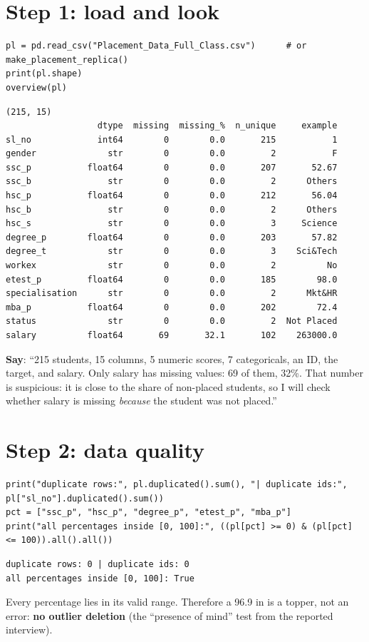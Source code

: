 \section{Step 1: load and look}
\begin{lstlisting}
pl = pd.read_csv("Placement_Data_Full_Class.csv")      # or make_placement_replica()
print(pl.shape)
overview(pl)
\end{lstlisting}
\outlabel
\begin{lstlisting}[style=out]
(215, 15)
                  dtype  missing  missing_%  n_unique     example
sl_no             int64        0        0.0       215           1
gender              str        0        0.0         2           F
ssc_p           float64        0        0.0       207       52.67
ssc_b               str        0        0.0         2      Others
hsc_p           float64        0        0.0       212       56.04
hsc_b               str        0        0.0         2      Others
hsc_s               str        0        0.0         3     Science
degree_p        float64        0        0.0       203       57.82
degree_t            str        0        0.0         3    Sci&Tech
workex              str        0        0.0         2          No
etest_p         float64        0        0.0       185        98.0
specialisation      str        0        0.0         2      Mkt&HR
mba_p           float64        0        0.0       202        72.4
status              str        0        0.0         2  Not Placed
salary          float64       69       32.1       102    263000.0
\end{lstlisting}
\textbf{Say}: ``215 students, 15 columns, 5 numeric scores, 7 categoricals, an ID, the target, and salary. Only salary has missing values: 69 of them, 32\%. That
number is suspicious: it is close to the share of non-placed students, so I will check whether salary is missing \emph{because} the student was not placed.''

\section{Step 2: data quality}
\begin{lstlisting}
print("duplicate rows:", pl.duplicated().sum(), "| duplicate ids:", pl["sl_no"].duplicated().sum())
pct = ["ssc_p", "hsc_p", "degree_p", "etest_p", "mba_p"]
print("all percentages inside [0, 100]:", ((pl[pct] >= 0) & (pl[pct] <= 100)).all().all())
\end{lstlisting}
\outlabel
\begin{lstlisting}[style=out]
duplicate rows: 0 | duplicate ids: 0
all percentages inside [0, 100]: True
\end{lstlisting}
Every percentage lies in its valid range. Therefore a 96.9 in  is a topper, not an error: \textbf{no outlier deletion} (the ``presence of mind'' test from the
reported interview).

